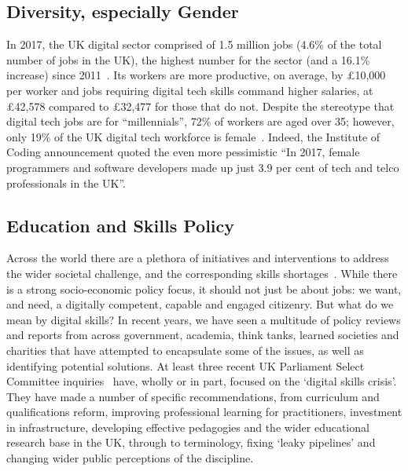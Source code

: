 \documentclass[sigconf,anonymous]{acmart}
\begin{document}
\subsection{Diversity, especially Gender}\label{sec:Gender}

In 2017, the UK digital sector comprised of 1.5 million jobs (4.6\% of
the total number of jobs in the UK), the highest number for the sector
(and a 16.1\% increase) since 2011~\cite{dcms:2017}. Its workers are
more productive, on average, by \pounds10,000 per worker and jobs
requiring digital tech skills command higher salaries, at
\pounds42,578 compared to \pounds32,477 for those that do not. Despite
the stereotype that digital tech jobs are for ``millennials'', 72\% of
workers are aged over 35; however, only 19\% of the UK digital tech
workforce is female~\cite{technation:2018}. Indeed, the Institute of
Coding announcement \cite{DfE2018a} quoted the even more pessimistic
``In 2017, female programmers and software developers made up just 3.9
per cent of tech and telco professionals in the UK''.

\subsection{Education and Skills Policy}

Across the world there are a plethora of initiatives and interventions
to address the wider societal challenge, and the corresponding skills
shortages~\cite{cece:2017}. While there is a strong socio-economic
policy focus, it should not just be about jobs: we want, and need, a
digitally competent, capable and engaged citizenry. But what do we
mean by digital skills? In recent years, we have seen a multitude of
policy reviews and reports from across government, academia, think
tanks, learned societies and charities that have attempted to
encapsulate some of the issues, as well as identifying potential
solutions. At least three recent UK Parliament Select Committee
inquiries~\cite{ukholds:2015,ukhocst:2016,ukholc:2017} have, wholly or
in part, focused on the `digital skills crisis'. They have made a
number of specific recommendations, from curriculum and qualifications
reform, improving professional learning for practitioners, investment
in infrastructure, developing effective pedagogies and the wider
educational research base in the UK, through to terminology, fixing
`leaky pipelines' and changing wider public perceptions of the
discipline.
\end{document}
